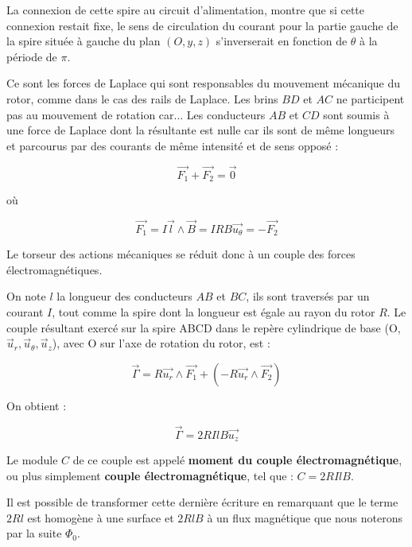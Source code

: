 \documentclass[12pt,prb,aps,epsf]{article}
\begin{document}
La connexion de cette spire au circuit d'alimentation, montre que si cette connexion restait fixe, le sens de circulation du courant pour la partie gauche de la spire située à gauche du plan $(O,y,z)$ s'inverserait en fonction de $\theta$ à la période de $\pi$. \medskip

Ce sont les forces de Laplace qui sont responsables du mouvement mécanique du rotor, comme dans le cas des rails de Laplace. Les brins $BD$ et $AC$ ne participent pas au mouvement de rotation car... Les conducteurs $AB$ et $CD$ sont soumis à une force de Laplace dont la résultante est nulle car ils sont de même longueurs et parcourus par des courants de même intensité et de sens opposé :

\begin{equation}
    \vec{F_1} + \vec{F_2} = \vec{0}
\end{equation}

où

\begin{equation}
    \vec{F_1} = I\vec{l} \land \vec{B} = IRB \vec{u_\theta} = -\vec{F_2}
\end{equation}

Le torseur des actions mécaniques se réduit donc à un couple des forces électromagnétiques.\medskip

On note $l$ la longueur des conducteurs $AB$ et $BC$, ils sont traversés par un courant $I$, tout comme la spire dont la longueur est égale au rayon du rotor $R$. Le couple résultant exercé sur la spire ABCD dans le repère cylindrique de base (O, $\vec{u}_r, \vec{u}_{\theta},\vec{u}_z$), avec O sur l'axe de rotation du rotor, est :

\begin{equation}
    \vec{\Gamma} = R\vec{u_r} \land \vec{F_1} + (-R\vec{u_r} \land \vec{F_2})
\end{equation}

On obtient :

\begin{equation}
    \vec{\Gamma} = 2RIlB \vec{u_z}
\end{equation}

Le module $C$ de ce couple est appelé \textbf{moment du couple électromagnétique}, ou plus simplement \textbf{couple électromagnétique}, tel que : $C = 2RIlB$. \medskip


Il est possible de transformer cette dernière écriture en remarquant que le terme $2Rl$ est homogène à une surface et $2RlB$ à un flux magnétique que nous noterons par la suite $\Phi_0$.
\end{document}
